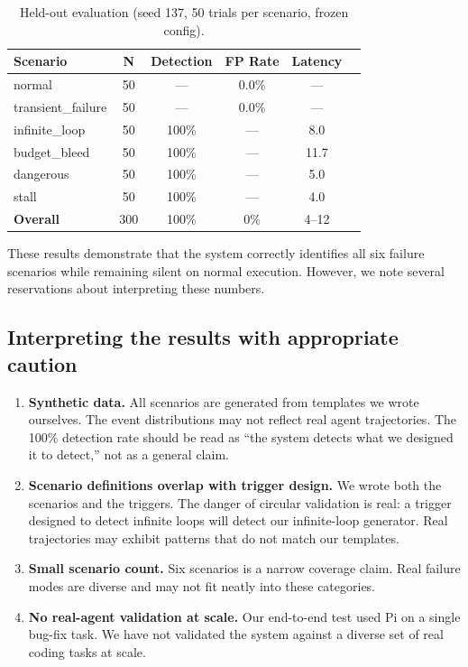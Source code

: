 \documentclass[11pt,a4paper]{article}
\begin{document}
\begin{table}[H]
\centering
\begin{tabular}{lccccc}
\toprule
\textbf{Scenario} & \textbf{N} & \textbf{Detection} & \textbf{FP Rate} & \textbf{Latency} \\
\midrule
normal & 50 & --- & 0.0\% & --- \\
transient\_failure & 50 & --- & 0.0\% & --- \\
infinite\_loop & 50 & 100\% & --- & 8.0 \\
budget\_bleed & 50 & 100\% & --- & 11.7 \\
dangerous & 50 & 100\% & --- & 5.0 \\
stall & 50 & 100\% & --- & 4.0 \\
\midrule
\textbf{Overall} & 300 & 100\% & 0\% & 4--12 \\
\bottomrule
\end{tabular}
\caption{Held-out evaluation (seed 137, 50 trials per scenario, frozen config).}
\end{table}

These results demonstrate that the system correctly identifies all six failure scenarios while remaining silent on normal execution. However, we note several reservations about interpreting these numbers.

\subsection{Interpreting the results with appropriate caution}

\begin{enumerate}
\item \textbf{Synthetic data.} All scenarios are generated from templates we wrote ourselves. The event distributions may not reflect real agent trajectories. The 100\% detection rate should be read as ``the system detects what we designed it to detect,'' not as a general claim.

\item \textbf{Scenario definitions overlap with trigger design.} We wrote both the scenarios and the triggers. The danger of circular validation is real: a trigger designed to detect infinite loops will detect our infinite-loop generator. Real trajectories may exhibit patterns that do not match our templates.

\item \textbf{Small scenario count.} Six scenarios is a narrow coverage claim. Real failure modes are diverse and may not fit neatly into these categories.

\item \textbf{No real-agent validation at scale.} Our end-to-end test used Pi on a single bug-fix task. We have not validated the system against a diverse set of real coding tasks at scale.
\end{enumerate}
\end{document}
